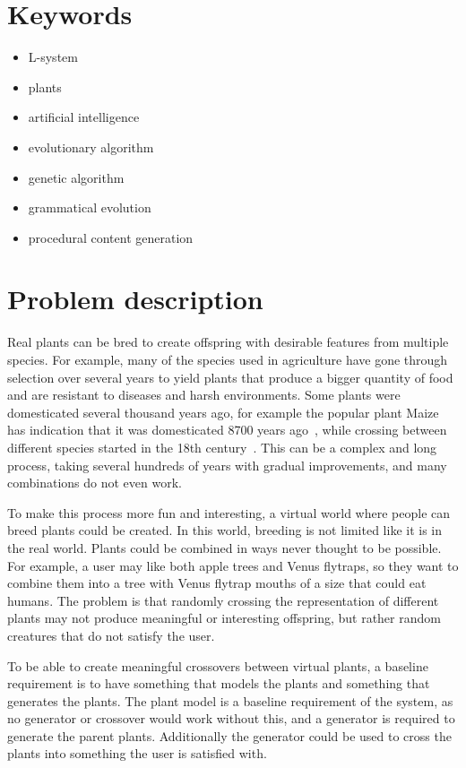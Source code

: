 \section{Keywords}
\begin{itemize}
    \item L-system
    \item plants
    \item artificial intelligence
    \item evolutionary algorithm
    \item genetic algorithm
    \item grammatical evolution
    \item procedural content generation
\end{itemize}

\section{Problem description}
\label{sec:problem}
Real plants can be bred to create offspring with desirable features from multiple species.
For example, many of the species used in agriculture have gone through selection over several years to yield plants that produce a bigger quantity of food and are resistant to diseases and harsh environments.
Some plants were domesticated several thousand years ago, for example the popular plant Maize has indication that it was domesticated 8700 years ago~\cite{2009Starch}, while crossing between different species started in the 18th century~\cite{PlantBreeding}.
This can be a complex and long process, taking several hundreds of years with gradual improvements, and many combinations do not even work.~\cite{2014Hartung, PlantBreeding}

To make this process more fun and interesting, a virtual world where people can breed plants could be created.
In this world, breeding is not limited like it is in the real world.
Plants could be combined in ways never thought to be possible.
For example, a user may like both apple trees and Venus flytraps, so they want to combine them into a tree with Venus flytrap mouths of a size that could eat humans.
The problem is that randomly crossing the representation of different plants may not produce meaningful or interesting offspring, but rather random creatures that do not satisfy the user.

To be able to create meaningful crossovers between virtual plants, a baseline requirement is to have something that models the plants and something that generates the plants.
The plant model is a baseline requirement of the system, as no generator or crossover would work without this, and a generator is required to generate the parent plants.
Additionally the generator could be used to cross the plants into something the user is satisfied with.

